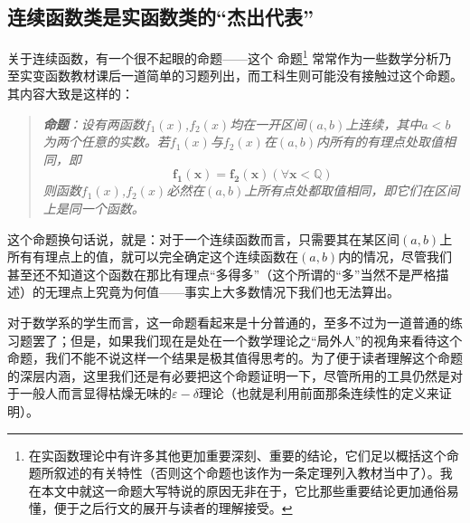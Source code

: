 \documentclass[12pt,a4paper]{article}
\begin{document}
{		\subsection{连续函数类是实函数类的“杰出代表”}{
			关于连续函数，有一个很不起眼的命题——这个  命题\footnote{在实函数理论中有许多其他更加重要深刻、重要的结论，它们足以概括这个命题所叙述的有关特性（否则这个命题也该作为一条定理列入教材当中了）。我在本文中就这一命题大写特说的原因无非在于，它比那些重要结论更加通俗易懂，便于之后行文的展开与读者的理解接受。}  常常作为一些数学分析乃至实变函数教材课后一道简单的习题列出，而工科生则可能没有接触过这个命题。其内容大致是这样的：
			\begin{quote} \itshape
				{\bfseries 命题}：设有两函数$f_1(x)$,$f_2(x)$均在一开区间$(a,b)$上连续，其中$a<b$为两个任意的实数。若$f_1(x)$与$f_2(x)$在$(a,b)$内所有的有理点处取值相同，即
				\[\boldsymbol{f_1(x)=f_2(x)(\forall x<\mathbb{Q})}\]
				则函数$f_1(x)$,$f_2(x)$必然在$(a,b)$上所有点处都取值相同，即它们在区间上是同一个函数。
			\end{quote}
			
			这个命题换句话说，就是：对于一个连续函数而言，只需要其在某区间$(a,b)$上所有有理点上的值，就可以完全确定这个连续函数在$(a,b)$内的情况，尽管我们甚至还不知道这个函数在那比有理点“多得多”（这个所谓的“多”当然不是严格描述）的无理点上究竟为何值——事实上大多数情况下我们也无法算出。
			
			对于数学系的学生而言，这一命题看起来是十分普通的，至多不过为一道普通的练习题罢了；但是，如果我们现在是处在一个数学理论之“局外人”的视角来看待这个命题，我们不能不说这样一个结果是极其值得思考的。为了便于读者理解这个命题的深层内涵，这里我们还是有必要把这个命题证明一下，尽管所用的工具仍然是对于一般人而言显得枯燥无味的$\varepsilon−\delta$理论（也就是利用前面那条连续性的定义来证明）。
			
}}
\end{document}
